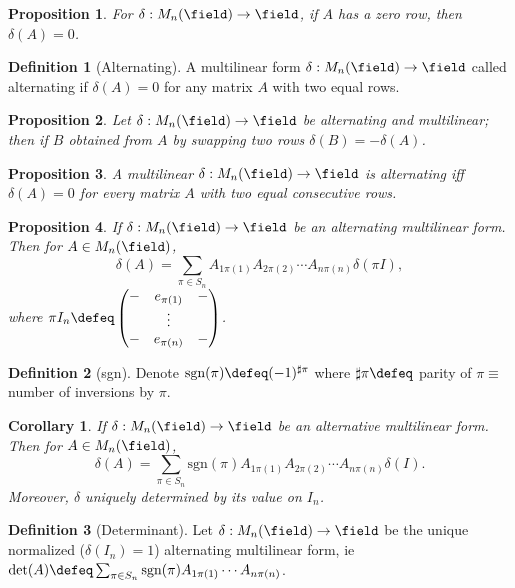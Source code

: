 \documentclass[12pt, oneside]{article}
\theoremstyle{definition}
\newtheorem{defn}{Definition}
\theoremstyle{plain}
\newtheorem{cor}{Corollary}
\newtheorem{prop}{Proposition}
\theoremstyle{remark}
\begin{document}
\begin{prop}
  For $\delta : M_n(\field)
\to \field$, if $A$ has a zero row, then $\delta(A) = 0$.
\end{prop}

\begin{defn}[Alternating]
  A multilinear form $\delta : M_n(\field) \to \field$ called alternating if $\delta(A) = 0$ for any matrix $A$ with two equal rows.
\end{defn}

\begin{prop}
  Let $\delta : M_n(\field) \to \field$ be alternating and multilinear; then if $B$ obtained from $A$ by swapping two rows $\delta(B) = - \delta(A)$. 
\end{prop}

\begin{prop}
  A multilinear $\delta : M_n(\field) \to \field$ is alternating iff $\delta(A) = 0$ for every matrix $A$ with two equal consecutive rows.
\end{prop}

\begin{prop}
  If $\delta : M_n(\field) \to \field$ be an alternating multilinear form. Then for $A \in M_n(\field)$, \[\delta(A) =\sum_{\pi \in S_n} A_{1\pi(1)} A_{2 \pi(2)} \cdots A_{n \pi(n)} \delta(\pi I),\]
  where $\pi I_n \defeq \begin{pmatrix}
    - & e_{\pi(1)} & -\\
        & \vdots & \\
        - & e_{\pi(n)} & -
  \end{pmatrix}$.
\end{prop}
\begin{defn}[sgn]
  Denote $\text{sgn}(\pi) \defeq (-1)^{\sharp \pi}$ where $\sharp \pi \defeq$ parity of $\pi \equiv$ number of inversions by $\pi$.
\end{defn}

\begin{cor}
  If $\delta : M_n(\field) \to \field$ be an alternative multilinear form. Then for $A \in M_n(\field)$, \[ \delta(A) = \sum_{\pi \in S_n} \text{sgn}(\pi)A_{1\pi(1)} A_{2 \pi(2)} \cdots A_{n \pi(n)} \delta(I).\]
  Moreover, $\delta$ uniquely determined by its value on $I_n$.
\end{cor}

\begin{defn}[Determinant]
  Let $\delta : M_n(\field) \to \field$ be the unique normalized ($\delta(I_n) = 1$) alternating multilinear form, ie $\det(A) \defeq \sum_{ \pi \in S_n} \text{sgn}(\pi) A_{1 \pi(1)} \cdots A_{n \pi(n)}$.
\end{defn}
\end{document}
